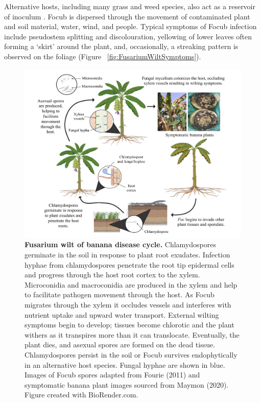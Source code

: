 Alternative hosts, including many grass and weed species, also act as a reservoir of inoculum \parencite{Hennessy2005}.  \ac{Focub} is dispersed through the movement of contaminated plant and soil material, water, wind, and people. Typical symptoms of \ac{Focub} infection include pseudostem splitting and discolouration, yellowing of lower leaves often forming a ‘skirt’ around the plant, and, occasionally, a streaking pattern is observed on the foliage (Figure ~\ref{fig:FusariumWiltSymptoms}). 

\newpage{}
\begin{figure}[p!]
    \includegraphics[width=16cm]{Figures/MyLifeCylceNarrow.pdf}
    \caption[Fusarium wilt of banana disease cycle.]{\textbf{Fusarium wilt of banana disease cycle.} Chlamydospores germinate in the soil in response to plant root exudates. Infection hyphae from chlamydospores penetrate the root tip epidermal cells and progress through the host root cortex to the xylem. Microconidia and macroconidia are produced in the xylem and help to facilitate pathogen movement through the host. As \acl{Focub} migrates through the xylem it occludes vessels and interferes with nutrient uptake and upward water transport. External wilting symptoms begin to develop; tissues become chlorotic and the plant withers as it transpires more than it can translocate. Eventually, the plant dies, and asexual spores are formed on the dead tissue. Chlamydospores persist in the soil or \acl{Focub}  survives endophytically in an alternative host species. Fungal hyphae are shown in blue. Images of \acl{Focub}  spores adapted from Fourie \et  (2011) and symptomatic banana plant images sourced from Maymon \et  (2020). Figure created with BioRender.com.}
    \label{fig:MyLifeCycle}
\end{figure}
\clearpage


